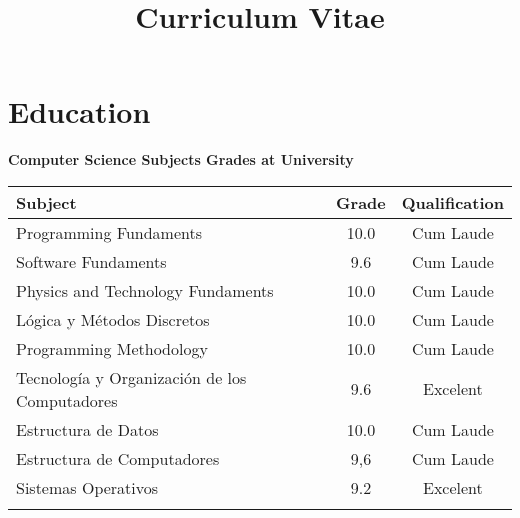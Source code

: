 \documentclass[10pt,a4paper,sans]{moderncv} %
\title{Curriculum Vitae}
\begin{document}
\makecvtitle %


\section{Education}




\kern 2mm

\centerline{\textbf{Computer Science Subjects Grades at University}}
\centering \begin{tabular}{lcc}
    \toprule
    \textbf{Subject} & \textbf{ Grade } & \textbf{ Qualification}   \\ 
    \midrule
    Programming Fundaments                        & 10.0 & Cum Laude  \\ 
    Software Fundaments                           & 9.6  & Cum Laude  \\
    Physics and Technology Fundaments             & 10.0 & Cum Laude  \\ 
    Lógica y Métodos Discretos                    & 10.0 & Cum Laude  \\
    Programming Methodology                       & 10.0 & Cum Laude  \\
    Tecnología y Organización de los Computadores & 9.6  & Excelent   \\
    Estructura de Datos                           & 10.0 & Cum Laude  \\
    Estructura de Computadores                    & 9,6  & Cum Laude  \\
    Sistemas Operativos                           & 9.2  & Excelent   \\
    \bottomrule
    \\
\end{tabular}
\end{document}
